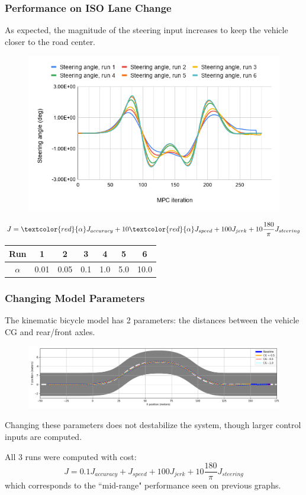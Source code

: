 \documentclass{beamer}
\begin{document}
\begin{frame}
\frametitle{Performance on ISO Lane Change}

As expected, the magnitude of the steering input increases to keep the vehicle closer to the road center.
\vspace{-0.5em}
\begin{figure}
	\includegraphics[width=0.8\linewidth]{figures/steering_angle.png}
\end{figure}
\vspace{-1.0em}

\small
$$J = \textcolor{red}{\alpha} J_{accuracy} + 10\textcolor{red}{\alpha} J_{speed} + 100 J_{jerk} + 10\frac{180}{\pi} J_{steering}$$

\begin{table}
\begin{tabular}{c|cccccc}
Run & 1 & 2 & 3 & 4 & 5 & 6
\\\hline
$\alpha$ & 0.01 & 0.05 & 0.1 & 1.0 & 5.0 & 10.0
\end{tabular}
\end{table}
\normalsize
\end{frame}


\begin{frame}
\frametitle{Changing Model Parameters}

The kinematic bicycle model has 2 parameters: the distances between the vehicle CG and rear/front axles.

\vspace{-0.5em}
\begin{figure}
	\centering
	\includegraphics[width=1.0\linewidth]{figures/road_paths_cg.png}
\end{figure}


Changing these parameters does not destabilize the system, though
larger control inputs are computed.

All 3 runs were computed with cost:
$$J = 0.1J_{accuracy} + J_{speed} + 100J_{jerk} + 10\frac{180}{\pi} J_{steering}$$
which corresponds to the ``mid-range" performance seen on previous graphs.
\end{frame}
\end{document}

